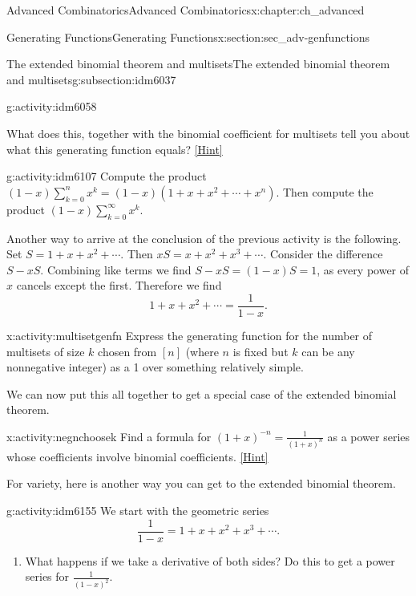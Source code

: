 \documentclass[oneside,10pt,]{book}
\numberwithin{equation}{chapter}
\begin{document}
\begin{chapterptx}{Advanced Combinatorics}{}{Advanced Combinatorics}{}{}{x:chapter:ch_advanced}
\begin{sectionptx}{Generating Functions}{}{Generating Functions}{}{}{x:section:sec_adv-genfunctions}
\begin{subsectionptx}{The extended binomial theorem and multisets}{}{The extended binomial theorem and multisets}{}{}{g:subsection:idm6037}
\begin{activity}{}{g:activity:idm6058}
\begin{enumerate}[font=\bfseries,label=(\alph*),ref=\alph*]
\par
What does this, together with the binomial coefficient for multisets tell you about what this generating function equals?%
\space\hspace*{0pt}\hfill{\tiny\hyperlink{g:hint:idm6093-back}{[Hint]}}\end{enumerate}
\end{activity}
\begin{activity}{}{g:activity:idm6107}%
Compute the product \((1-x)\sum_{k=0}^n x^k = (1-x)(1+x+x^2+\cdots+x^n)\).  Then compute the product \((1-x)\sum_{k=0}^\infty x^k\).%
\end{activity}
Another way to arrive at the conclusion of the previous activity is the following.  Set \(S = 1 + x + x^2 + \cdots\).  Then \(xS = x + x^2 + x^3 + \cdots\).  Consider the difference \(S - xS\).  Combining like terms we find \(S-xS = (1-x)S = 1\), as every power of \(x\) cancels except the first.  Therefore we find%
\begin{equation*}
1 + x + x^2 + \cdots = \frac{1}{1-x}\text{.}
\end{equation*}
%
\begin{activity}{}{x:activity:multisetgenfn}%
Express the generating function for the number of multisets of size \(k\) chosen from \([n]\) (where \(n\) is fixed but \(k\) can be any nonnegative integer) as a 1 over something relatively simple.%
\end{activity}
We can now put this all together to get a special case of the extended binomial theorem.%
\begin{activity}{}{x:activity:negnchoosek}%
Find a formula for \((1+x)^{-n} = \frac{1}{(1+x)^n}\) as a power series whose coefficients involve binomial coefficients.%
\space\hspace*{0pt}\hfill{\tiny\hyperlink{g:hint:idm6143-back}{[Hint]}}\end{activity}
For variety, here is another way you can get to the extended binomial theorem.%
\begin{activity}{}{g:activity:idm6155}%
We start with the geometric series%
\begin{equation*}
\frac{1}{1-x} = 1 + x + x^2 + x^3+ \cdots\text{.}
\end{equation*}
%
\begin{enumerate}[font=\bfseries,label=(\alph*),ref=\alph*]
\item{}What happens if we take a derivative of both sides?  Do this to get a power series for \(\frac{1}{(1-x)^2}\).%

\end{enumerate}
\end{activity}
\end{subsectionptx}
\end{sectionptx}
\end{chapterptx}
\end{document}
